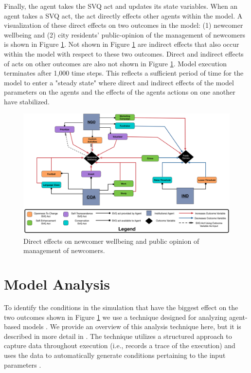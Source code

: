 \documentclass{scspaperproc}
\theoremstyle{scsthe}
\begin{document}
Finally, the agent takes the SVQ act and updates its state variables. When an agent takes a SVQ act, the act directly effects other agents within the model. A visualization of these direct effects on two outcomes in the model: (1) newcomer wellbeing and (2) city residents' public-opinion of the management of newcomers is shown in Figure \ref{fig:model-dynamics}. Not shown in Figure \ref{fig:model-dynamics} are indirect effects that also occur within the model with respect to these two outcomes. Direct and indirect effects of acts on other outcomes are also not shown in Figure \ref{fig:model-dynamics}. Model execution terminates after 1,000 time steps. This reflects a sufficient period of time for the model to enter a "steady state" where direct and indirect effects of the model parameters on the agents and the effects of the agents actions on one another have stabilized.

\begin{figure}[htb]
{
\centering
\includegraphics[width=0.75\columnwidth]{Newcomer-Wellbeing-Causal.png}
\caption{Direct effects on newcomer wellbeing and public opinion of management of newcomers.}
\label{fig:model-dynamics}
}
\end{figure}

\section{Model Analysis}
To identify the conditions in the simulation that have the biggest effect on the two outcomes shown in Figure \ref{fig:model-dynamics} we use a technique designed for analyzing agent-based models \cite{gore2017applying}. We provide an overview of this analysis technique here, but it is described in more detail in \cite{gore2015statistical}. The technique utilizes a structured approach to capture data throughout execution (i.e., records a trace of the execution) and uses the data to automatically generate conditions pertaining to the input parameters \cite{gore2017augmenting}. 
\end{document}
